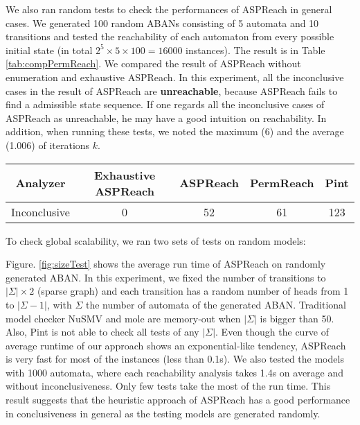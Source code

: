 \documentclass{entcs}
\begin{document}
We also ran random tests to check the performances of ASPReach in general cases.
We generated 100 random ABANs consisting of 5 automata and 10 transitions and tested the reachability of each automaton from every possible initial state (in total $2^5\times5\times100=16000$ instances). 
The result is in Table \ref{tab:compPermReach}.
We compared the result of ASPReach without enumeration and exhaustive ASPReach.
In this experiment, all the inconclusive cases in the result of ASPReach are \textbf{unreachable}, because ASPReach fails to find a admissible state sequence.
If one regards all the inconclusive cases of ASPReach as unreachable, he may have a good intuition on reachability.
In addition, when running these tests, we noted the maximum (6) and the average (1.006) of iterations $k$. 


\begin{table*}[htb]
    \centering
    \begin{tabular}{|c|c|c|c|c|}
        \hline
        Analyzer & Exhaustive ASPReach & ASPReach& PermReach&Pint\\
        \hline
        Inconclusive & 0&52&61&123\\
        \hline
    \end{tabular}
    \caption{\label{tab:compPermReach}Result of 16000 random tests. Exhaustive ASPReach runs a search on every possible assignment on OR gates thus is firmly conclusive. ASPReach, PermReach and Pint result in inconclusive cases. Except inconclusive cases, the results are consistent between different approaches.}
\end{table*}

To check global scalability, we ran two sets of tests on random models: 

Figure. \ref{fig:sizeTest} shows the average run time of ASPReach on randomly generated ABAN.
In this experiment, we fixed the number of transitions to $|\Sigma|\times2$ (sparse graph) and each transition has a random number of heads from 1 to $|\Sigma-1|$, with $\Sigma$ the number of automata of the generated ABAN.
Traditional model checker NuSMV and mole are memory-out when $|\Sigma|$ is bigger than 50. 
Also, Pint is not able to check all tests of any $|\Sigma|$.
Even though the curve of average runtime of our approach shows an exponential-like tendency, ASPReach is very fast for most of the instances (less than 0.1s).
We also tested the models with 1000 automata, where each reachability analysis takes 1.4s on average and without inconclusiveness.
Only few tests take the most of the run time.
This result suggests that the heuristic approach of ASPReach has a good performance in conclusiveness in general as the testing models are generated randomly.
\end{document}
